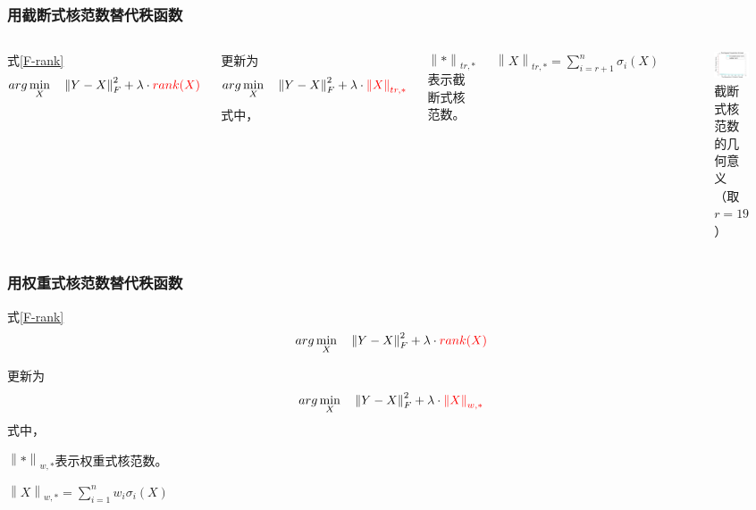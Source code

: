 \documentclass[10pt,aspectratio=43,mathserif]{beamer}
\begin{document}
\begin{frame}
\frametitle{\textbf{用截断式核范数替代秩函数}}
\begin{columns}
\par 式\ref{F-rank}
\begin{displaymath}
arg\min\limits_{X} \quad \left\|Y-X\right\|_F^2 + \lambda \cdot {\color{red}{rank(X)}}
\end{displaymath}
\par 更新为
\begin{equation}
\centering
arg\min\limits_{X} \quad \left\|Y-X\right\|_F^2 + \lambda \cdot {\color{red}{\left\|X\right\|_{tr,*}}}
\label{F-TNN}
\end{equation}
式中，
\par $\left\|*\right\|_{tr,*}$表示截断式核范数。
\par $\left\|X\right\|_{tr,*} = \sum\limits_{i=r+1}^{n}\sigma_i(X)$

\begin{figure}[!t]
\centering
\includegraphics[scale=0.3]{surrogate-to-rank-2.png}
\caption{截断式核范数的几何意义（取$r=19$）}
\label{surrogate-to-rank-2}
\end{figure}
\end{columns}
\end{frame}

\begin{frame}
\frametitle{\textbf{用权重式核范数替代秩函数}}
\par 式\ref{F-rank}
\begin{displaymath}
arg\min\limits_{X} \quad \left\|Y-X\right\|_F^2 + \lambda \cdot {\color{red}{rank(X)}}
\end{displaymath}
\par 更新为
\begin{equation}
\centering
arg\min\limits_{X} \quad \left\|Y-X\right\|_F^2 + \lambda \cdot {\color{red}{\left\|X\right\|_{w,*}}}
\label{F-WNN}
\end{equation}
式中，
\par $\left\|*\right\|_{w,*}$表示权重式核范数。
\par $\left\|X\right\|_{w,*} = \sum\limits_{i=1}^{n}w_i\sigma_i(X)$
\end{frame}
\end{document}
